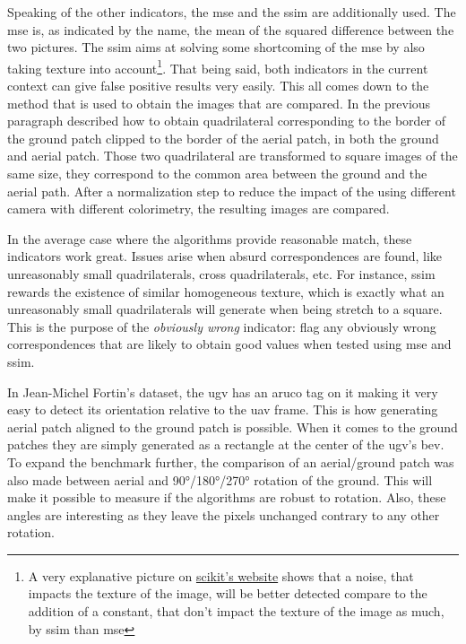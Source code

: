 Speaking of the other indicators, the \gls{mse} and the \gls{ssim} are additionally used.
The \gls{mse} is, as indicated by the name, the mean of the squared difference between the two pictures.
The \gls{ssim} aims at solving some shortcoming of the \gls{mse} by also taking texture into account\footnote{A
very explanative picture on \href{https://scikit-image.org/docs/0.25.x/auto_examples/transform/plot_ssim.html}{scikit's website}
shows that a noise, that impacts the texture of the image, will be better detected compare to the addition of a constant,
    that don't impact the texture of the image as much, by \gls{ssim} than \gls{mse}}.
That being said, both indicators in the current context can give false positive results very easily.
This all comes down to the method that is used to obtain the images that are compared.
In the previous paragraph described how to obtain quadrilateral corresponding to the border of the ground patch clipped to the
border of the aerial patch, in both the ground and aerial patch.
Those two quadrilateral are transformed to square images of the same size, they correspond to the common area between the ground and the aerial path.
After a normalization step to reduce the impact of the using different camera with different colorimetry, the resulting images are compared.

In the average case where the algorithms provide reasonable match, these indicators work great.
Issues arise when absurd correspondences are found, like unreasonably small quadrilaterals, cross quadrilaterals, etc.
For instance, \gls{ssim} rewards the existence of similar homogeneous texture, which is exactly what an unreasonably small quadrilaterals
will generate when being stretch to a square.
This is the purpose of the \textit{obviously wrong} indicator: flag any obviously wrong correspondences that are likely
to obtain good values when tested using \gls{mse} and \gls{ssim}.

In Jean-Michel Fortin's dataset, the \gls{ugv} has an aruco tag on it making it very easy to detect its orientation relative
to the \gls{uav} frame.
This is how generating aerial patch aligned to the ground patch is possible.
When it comes to the ground patches they are simply generated as a rectangle at the center of the \gls{ugv}'s \gls{bev}.
To expand the benchmark further, the comparison of an aerial/ground patch was also made between aerial and 90°/180°/270°
rotation of the ground.
This will make it possible to measure if the algorithms are robust to rotation.
Also, these angles are interesting as they leave the pixels unchanged contrary to any other rotation.

